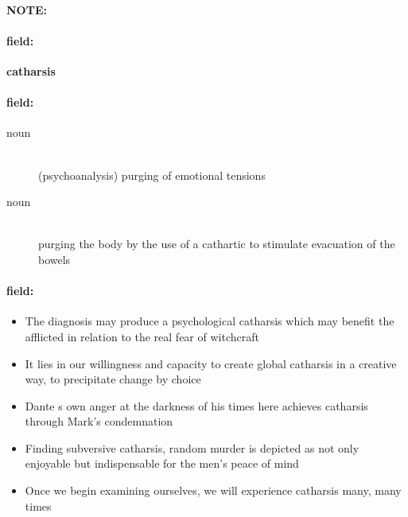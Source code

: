 \documentclass[12pt]{article}
\newenvironment{note}{\paragraph{NOTE:}}{}
\newenvironment{field}{\paragraph{field:}}{}
\begin{document}
\begin{note}
\begin{field}
\textbf{\large catharsis}
\end{field}


\begin{field}
\begin{description}
\item[noun] \hfill \\ 
(psychoanalysis) purging of emotional tensions

\item[noun] \hfill \\ 
purging the body by the use of a cathartic to stimulate evacuation of the bowels

\end{description}
\end{field}

\begin{field}
\begin{itemize}
\item The diagnosis may produce a psychological catharsis which may benefit the afflicted in relation to the real fear of witchcraft
\item It lies in our willingness and capacity to create global catharsis in a creative way, to precipitate change by choice
\item Dante s own anger at the darkness of his times here achieves catharsis through Mark's condemnation
\item Finding subversive catharsis, random murder is depicted as not only enjoyable but indispensable for the men's peace of mind
\item Once we begin examining ourselves, we will experience catharsis many, many times
\end{itemize}
\end{field}
\end{note}
\end{document}
